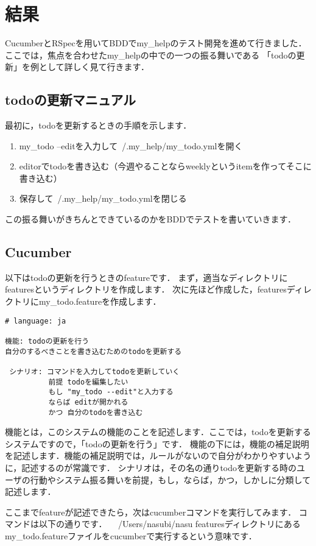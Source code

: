 
\section{結果}
CucumberとRSpecを用いてBDDでmy\_helpのテスト開発を進めて行きました．
ここでは，焦点を合わせたmy\_helpの中での一つの振る舞いである
「todoの更新」を例として詳しく見て行きます．

\subsection{todoの更新マニュアル}
最初に，todoを更新するときの手順を示します．

\begin{enumerate}
\item my\_todo --editを入力して~/.my\_help/my\_todo.ymlを開く
\item editorでtodoを書き込む（今週やることならweeklyというitemを作ってそこに書き込む）
\item 保存して~/.my\_help/my\_todo.ymlを閉じる
\end{enumerate}
この振る舞いがきちんとできているのかをBDDでテストを書いていきます．

\subsection{Cucumber}
以下はtodoの更新を行うときのfeatureです．
まず，適当なディレクトリにfeaturesというディレクトリを作成します．
次に先ほど作成した，featuresディレクトリにmy\_todo.featureを作成します．
\begin{lstlisting}[style=customCsh]
# language: ja 

機能: todoの更新を行う
自分のするべきことを書き込むためのtodoを更新する

 シナリオ: コマンドを入力してtodoを更新していく
          前提 todoを編集したい
          もし "my_todo --edit"と入力する
          ならば editが開かれる
          かつ 自分のtodoを書き込む
\end{lstlisting}
機能とは，このシステムの機能のことを記述します．ここでは，todoを更新するシステムですので，「todoの更新を行う」です．
機能の下には，機能の補足説明を記述します．機能の補足説明では，ルールがないので自分がわかりやすいように，記述するのが常識です．
シナリオは，その名の通りtodoを更新する時のユーザの行動やシステム振る舞いを前提，もし，ならば，かつ，しかしに分類して記述します．

ここまでfeatureが記述できたら，次はcucumberコマンドを実行してみます．
コマンドは以下の通りです．
　/Users/nasubi/nasu%
featuresディレクトリにあるmy\_todo.featureファイルをcucumberで実行するという意味です．

